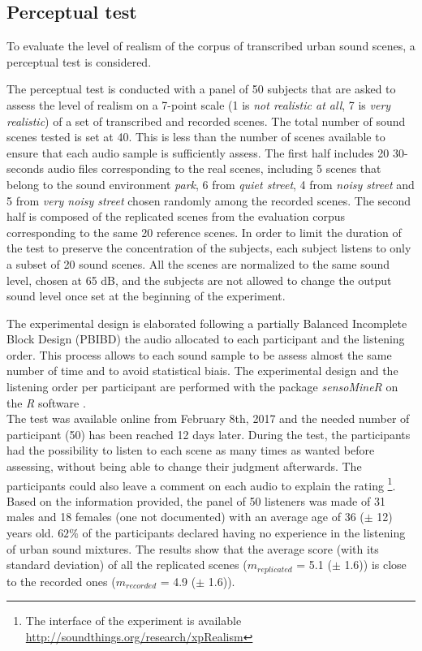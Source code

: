 \documentclass[review,5p,twocolumn,sort&compress,times]{elsarticle}
\begin{document}
\subsection{Perceptual test}

To evaluate the level of realism of the corpus of transcribed urban sound scenes, a perceptual test is considered.

The perceptual test is conducted with a panel of 50 subjects that are asked to assess the level of realism on a 7-point scale (1 is \textit{not realistic at all}, 7 is \textit{very realistic}) of a set of transcribed and recorded scenes. The total number of sound scenes tested is set at 40. This is less than the number of scenes available to ensure that each audio sample is sufficiently assess. The first half includes 20 30-seconds audio files corresponding to the real scenes, including 5 scenes that belong to the sound environment \textit{park}, 6 from \textit{quiet street}, 4 from \textit{noisy street} and 5 from \textit{very noisy street} chosen randomly among the recorded scenes. The second half is composed of the replicated scenes from the evaluation corpus corresponding to the same 20 reference scenes. In order to limit the duration of the test to preserve the concentration of the subjects, each subject listens to only a subset of 20 sound scenes. All the scenes are normalized to the same sound level, chosen at 65 dB, and the subjects are not allowed to change the output sound level once set at the beginning of the experiment.

The experimental design is elaborated following a partially Balanced Incomplete Block Design (PBIBD) \cite{john1977optimal} the audio allocated to each participant and the listening order. This process allows to each sound sample to be assess almost the same number of time and to avoid statistical biais. The experimental design and the listening order per participant are performed with the package \textit{sensoMineR} on the \textit{R} software \cite{le_sensominer:_2008}.\\

The test was available online from February 8th, 2017 and the needed number of participant (50) has been reached 12 days later. During the test, the participants had the possibility to listen to each scene as many times as wanted before assessing, without being able to change their judgment afterwards. The participants could also leave a comment on each audio to explain the rating \footnote{The interface of the experiment is available \url{http://soundthings.org/research/xpRealism}}. Based on the information provided, the panel of 50 listeners was made of 31 males and 18 females (one not documented) with an average age of 36 ($\pm$ 12) years old. $62\%$ of the participants declared having no experience in the listening of urban sound mixtures. 
The results show that the average score (with its standard deviation) of all the replicated scenes ($m_{replicated}$ = 5.1 ($\pm$ 1.6)) is close to the recorded ones ($m_{recorded}$ = 4.9 ($\pm$ 1.6)). 
\end{document}
